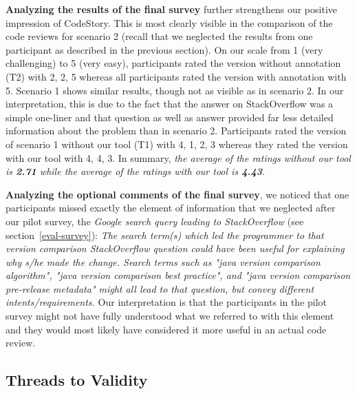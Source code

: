 \documentclass[../manifest.tex]{subfiles}
\begin{document}
\textbf{Analyzing the results of the final survey} further strengthens our positive impression of CodeStory. This is most clearly visible in the comparison of the code reviews for scenario 2 (recall that we neglected the results from one participant as described in the previous section). On our scale from 1 (very challenging) to 5 (very easy), participants rated the version without annotation (T2) with 2, 2, 5 whereas all participants rated the version with annotation with 5. Scenario 1 shows similar results, though not as visible as in scenario 2. In our interpretation, this is due to the fact that the answer on StackOverflow was a simple one-liner and that question as well as answer provided far less detailed information about the problem than in scenario 2. Participants rated the version of scenario 1 without our tool (T1) with 4, 1, 2, 3 whereas they rated the version with our tool with 4, 4, 3. In summary, \textit{the average of the ratings without our tool is \textbf{2.71} while the average of the ratings with our tool is \textbf{4.43}}.

\textbf{Analyzing the optional comments of the final survey}, we noticed that one participants missed exactly the element of information that we neglected after our pilot survey, the \textit{Google search query leading to StackOverflow} (see section~\ref{eval-survey}): \textit{The search term(s) which led the programmer to that version comparison StackOverflow question could have been useful for explaining why s/he made the change. Search terms such as "java version comparison algorithm", "java version comparison best practice", and "java version comparison pre-release metadata" might all lead to that question, but convey different intents/requirements.} Our interpretation is that the participants in the pilot survey might not have fully understood what we referred to with this element and they would most likely have considered it more useful in an actual code review.

\subsection{Threads to Validity} \label{eval-threats}

\end{document}
